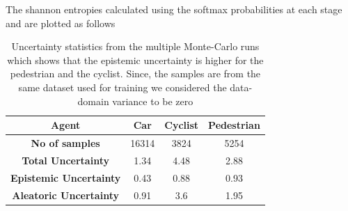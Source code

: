 \documentclass[10pt,twocolumn,letterpaper]{article}
\begin{document}
The shannon entropies calculated using the softmax probabilities at each stage and are plotted as follows 
\begin{table}[!htbp]
    \centering
    \begin{tabular}{|c|c|c|c|}
        \hline \textbf{Agent} & \textbf{Car} & \textbf{Cyclist} & \textbf{Pedestrian}  \\
        \hline \textbf{No of samples} & 16314 & 3824 & 5254 \\
        \hline \textbf{Total Uncertainty} & 1.34  & 4.48 & 2.88 \\
        \hline \textbf{Epistemic Uncertainty} & 0.43 & 0.88 & 0.93 \\
        \hline \textbf{Aleatoric Uncertainty} & 0.91 & 3.6 & 1.95 \\
        \hline
    \end{tabular}
	\caption{Uncertainty statistics from the multiple Monte-Carlo runs \label{tab:Uncertianty Statistics} which shows that the epistemic uncertainty is higher for the pedestrian and the cyclist. Since, the samples are from the same dataset used for training we considered the data-domain variance to be zero}
\end{table}
\end{document}
